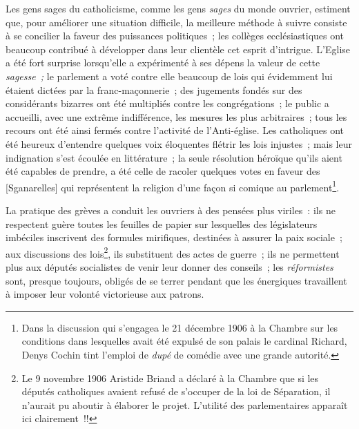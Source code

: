 \documentclass[french,twoside]{book} %
\newcommand\corr[1]{#1}
\begin{document}
Les gens sages du catholicisme, comme les gens \emph{sages} du monde ouvrier, estiment que, pour améliorer une situation difficile, la meilleure méthode à suivre consiste à se concilier la faveur des puissances politiques ; les collèges ecclésiastiques ont beaucoup contribué à développer dans leur clientèle cet esprit d’intrigue. L’Eglise a été fort surprise lorsqu’elle a expérimenté à ses dépens la valeur de cette \emph{sagesse ;} le parlement a voté contre elle beaucoup de lois qui évidemment lui étaient dictées par la franc-maçonnerie ; des jugements fondés sur des considérants bizarres ont été multipliés contre les congrégations ; le public a accueilli, avec une extrême indifférence, les mesures les plus arbitraires ; tous les recours ont été ainsi fermés contre l’activité de l’Anti-église. Les catholiques ont été heureux d’entendre quelques voix éloquentes flétrir les lois injustes ; mais leur indignation s’est écoulée en littérature ; la seule résolution héroïque qu’ils aient été capables de prendre, a été celle de racoler quelques votes en faveur des [{\corr Sganarelles}] qui représentent  la religion d’une façon si comique au parlement\footnote{ \noindent Dans la discussion qui s’engagea le 21 décembre 1906 à la Chambre sur les conditions dans lesquelles avait été expulsé de son palais le cardinal Richard, Denys Cochin tint l’emploi de \emph{dupé} de comédie avec une grande autorité.
 }.\par
La pratique des grèves a conduit les ouvriers à des pensées plus viriles : ils ne respectent guère toutes les feuilles de papier sur lesquelles des législateurs imbéciles inscrivent des formules mirifiques, destinées à assurer la paix sociale ; aux discussions des lois\footnote{ \noindent Le 9 novembre 1906 Aristide Briand a déclaré à la Chambre que si les députés catholiques avaient refusé de s’occuper de la loi de Séparation, il n’aurait pu aboutir à élaborer le projet. L’utilité des parlementaires apparaît ici clairement !!
 }, ils substituent des actes de guerre ; ils ne permettent plus aux députés socialistes de venir leur donner des conseils ; les \emph{réformistes} sont, presque toujours, obligés de se terrer pendant que les énergiques travaillent à imposer leur volonté victorieuse aux patrons.\par
\end{document}
